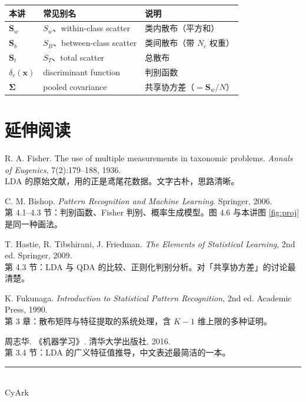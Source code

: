 \documentclass[11pt,a4paper,fontset=windows,zihao=-4]{ctexart}
\newcommand{\bx}{\mathbf{x}}
\newcommand{\bS}{\mathbf{S}}
\newcommand{\bSigma}{\boldsymbol{\Sigma}}
\newcommand{\tabhead}{\sffamily\bfseries\color{navy}}
\begin{document}
\begin{center}
\small
\begin{tabular}{@{}lll@{}}
\toprule
\rowcolor{navy!7}
\tabhead 本讲 & \tabhead 常见别名 & \tabhead 说明\\
\midrule
$\bS_w$ & $S_w$、within-class scatter & 类内散布（平方和）\\
$\bS_b$ & $S_B$、between-class scatter & 类间散布（带 $N_c$ 权重）\\
$\bS_t$ & $S_T$、total scatter & 总散布\\
$\delta_c(\bx)$ & discriminant function & 判别函数\\
$\bSigma$ & pooled covariance & 共享协方差（$=\bS_w/N$）\\
\bottomrule
\end{tabular}
\end{center}

\section{延伸阅读}

\begin{enumerate}[label={[\arabic*]},leftmargin=2.6em,itemsep=0.7em]
  \item R. A. Fisher. The use of multiple measurements in taxonomic problems.
  \emph{Annals of Eugenics}, 7(2):179--188, 1936.\\[1pt]
  {\footnotesize\color{steel}LDA 的原始文献，用的正是鸢尾花数据。文字古朴，思路清晰。}

  \item C. M. Bishop. \emph{Pattern Recognition and Machine Learning}. Springer, 2006.\\[1pt]
  {\footnotesize\color{steel}第 4.1--4.3 节：判别函数、Fisher 判别、概率生成模型。图 4.6 与本讲图 \ref{fig:proj} 是同一种画法。}

  \item T. Hastie, R. Tibshirani, J. Friedman. \emph{The Elements of Statistical Learning}, 2nd ed. Springer, 2009.\\[1pt]
  {\footnotesize\color{steel}第 4.3 节：LDA 与 QDA 的比较、正则化判别分析。对「共享协方差」的讨论最清楚。}

  \item K. Fukunaga. \emph{Introduction to Statistical Pattern Recognition}, 2nd ed. Academic Press, 1990.\\[1pt]
  {\footnotesize\color{steel}第 3 章：散布矩阵与特征提取的系统处理，含 $K-1$ 维上限的多种证明。}

  \item 周志华. 《机器学习》. 清华大学出版社, 2016.\\[1pt]
  {\footnotesize\color{steel}第 3.4 节：LDA 的广义特征值推导，中文表述最简洁的一本。}
\end{enumerate}

\vspace{1.0em}
\begin{flushright}
{\color{navy!25}\rule{3.2cm}{0.5pt}}\\[5pt]
{\kaishu\footnotesize\color{steel}CyArk}
\end{flushright}
\end{document}
